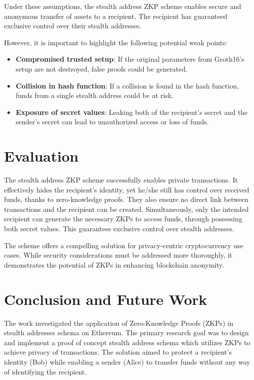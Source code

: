 \documentclass[conference,comsoc,10pt]{IEEEtran}
\begin{document}
    Under these assumptions, the stealth address ZKP scheme enables
    secure and anonymous transfer of assets to a recipient. The recipient
    has guaranteed exclusive control over their stealth addresses.

    However, it is important to highlight the following potential weak points:
    \begin{itemize}
        \item \textbf{Compromised trusted setup}: If the original parameters from
            Groth16's setup are not destroyed, false proofs could be generated.
        \item \textbf{Collision in hash function}: If a collision is found in
            the hash function, funds from a single stealth address could be at
            risk.
        \item \textbf{Exposure of secret values}: Leaking both of the
            recipient's secret and the sender's secret can lead to
            unauthorized access or loss of funds.
    \end{itemize}

\section{Evaluation}

    The stealth address ZKP scheme successfully enables private transactions.
    It effectively hides the recipient's identity, yet he/she still has control
    over received funds, thanks to zero-knowledge proofs. They also ensure no
    direct link between transactions and the recipient can be created.
    Simultaneously, only the intended recipient can generate the necessary
    ZKPs to access funds, through possessing both secret values. This
    guarantees exclusive control over stealth addresses.

    The scheme offers a compelling solution for privacy-centric cryptocurrency
    use cases. While security considerations must be addressed more thoroughly, it
    demonstrates the potential of ZKPs in enhancing blockchain anonymity.

\section{Conclusion and Future Work}

    The work investigated the application of Zero-Knowledge Proofs (ZKPs)
    in stealth addresses schema on Ethereum. The primary research
    goal was to design and implement a proof of concept stealth address schema
    which utilizes ZKPs to achieve privacy of transactions.
    The solution aimed to protect a recipient's identity (Bob) while enabling
    a sender (Alice) to transfer funds without any way of identifying the
    recipient.
\end{document}
